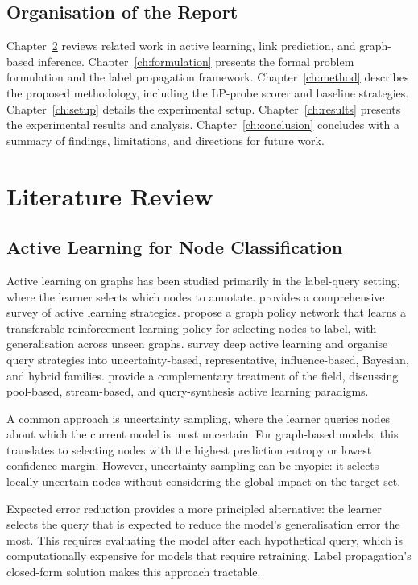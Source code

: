 \documentclass[12pt,a4paper,oneside]{report}
\begin{document}
\section{Organisation of the Report}

Chapter~\ref{ch:lit} reviews related work in active learning, link prediction, and graph-based inference. Chapter~\ref{ch:formulation} presents the formal problem formulation and the label propagation framework. Chapter~\ref{ch:method} describes the proposed methodology, including the LP-probe scorer and baseline strategies. Chapter~\ref{ch:setup} details the experimental setup. Chapter~\ref{ch:results} presents the experimental results and analysis. Chapter~\ref{ch:conclusion} concludes with a summary of findings, limitations, and directions for future work.


\chapter{Literature Review}
\label{ch:lit}

\section{Active Learning for Node Classification}

Active learning on graphs has been studied primarily in the label-query setting, where the learner selects which nodes to annotate. \citet{settles} provides a comprehensive survey of active learning strategies. \citet{gpa} propose a graph policy network that learns a transferable reinforcement learning policy for selecting nodes to label, with generalisation across unseen graphs. \citet{li_survey} survey deep active learning and organise query strategies into uncertainty-based, representative, influence-based, Bayesian, and hybrid families. \citet{ren} provide a complementary treatment of the field, discussing pool-based, stream-based, and query-synthesis active learning paradigms.

A common approach is uncertainty sampling, where the learner queries nodes about which the current model is most uncertain. For graph-based models, this translates to selecting nodes with the highest prediction entropy or lowest confidence margin. However, uncertainty sampling can be myopic: it selects locally uncertain nodes without considering the global impact on the target set.

Expected error reduction \citep{roy} provides a more principled alternative: the learner selects the query that is expected to reduce the model's generalisation error the most. This requires evaluating the model after each hypothetical query, which is computationally expensive for models that require retraining. Label propagation's closed-form solution makes this approach tractable.
\end{document}
